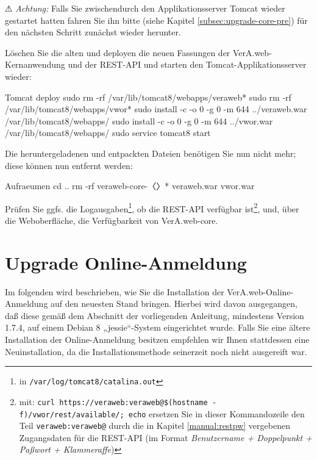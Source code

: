 \documentclass{tarentanleitung}
\newcommand{\vwiaverssw}{1.8.58}
\newif\ifoa
\begin{document}
⚠ \emph{Achtung:} Falls Sie zwischendurch den Applikationsserver
Tomcat wieder gestartet hatten fahren Sie ihn bitte (siehe Kapitel
\ref{subsec:upgrade-core-pre}) für den nächsten Schritt zunächst
wieder herunter.

\begin{minipage}{\linewidth}
Löschen Sie die alten und deployen die neuen Fassungen der
VerA.web-Kernanwendung und der REST-API und starten den
Tomcat-Applikationsserver wieder:

\begin{lstdump}{Tomcat deploy}
sudo rm -rf /var/lib/tomcat8/webapps/veraweb*
sudo rm -rf /var/lib/tomcat8/webapps/vwor*
sudo install -c -o 0 -g 0 -m 644 ../veraweb.war /var/lib/tomcat8/webapps/
sudo install -c -o 0 -g 0 -m 644 ../vwor.war /var/lib/tomcat8/webapps/
sudo service tomcat8 start
\end{lstdump}
\end{minipage}

\begin{minipage}{\linewidth}
Die heruntergeladenen und entpackten Dateien benötigen Sie nun nicht
mehr; diese können nun entfernt werden:

\begin{lstdump}{Aufraeumen}
cd ..
rm -rf veraweb-core-〈\lstdumpesc{\vwiaverssw}〉* veraweb.war vwor.war
\end{lstdump}
\end{minipage}

Prüfen Sie ggfs. die Logausgaben\Hair\footnote{\label{fn:tomcatlogs}in
\texttt{/var/log/tomcat8/catalina.out}}, ob die REST-API verfügbar
ist\Hair\footnote{\label{fn:vworcheck}mit:
\texttt{curl https://veraweb:veraweb@\$(hostname -f)/vwor/rest/available/; echo}%
\dash ersetzen Sie in dieser Kommandozeile den Teil \texttt{veraweb:veraweb@}
durch die in Kapitel \ref{manual:restpw} vergebenen Zugangsdaten für die
REST-API (im Format {\itshape Benutzername + Doppelpunkt + Paßwort +
Klammeraffe})}, und, über die Weboberfläche, die Verfügbarkeit von
VerA.web-core.

\ifoa

\section{Upgrade Online-Anmeldung}\label{sec:upgrade-oa}

Im folgenden wird beschrieben, wie Sie die Installation der
VerA.web-Online-Anmeldung auf den neuesten Stand bringen.
Hierbei wird davon ausgegangen, daß diese gemäß
  dem Abschnitt  der vorliegenden Anleitung,
  mindestens Version 1.7.4,
auf einem Debian 8 „jessie“-System eingerichtet wurde.
Falls Sie eine ältere Installation der Online-Anmeldung besitzen
empfehlen wir Ihnen stattdessen eine Neuinstallation, da die
Installationsmethode seinerzeit noch nicht ausgereift war.
\end{document}
